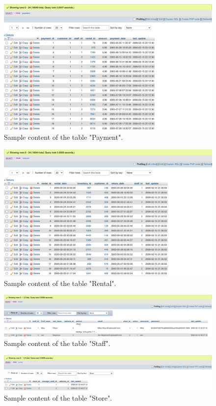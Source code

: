 \documentclass{article}
\begin{document}
		\begin{figure}[H]
			\includegraphics[width=\textwidth]{payment_content}
			\caption{Sample content of the table "Payment".}
		\end{figure}
		\begin{figure}[H]
			\includegraphics[width=\textwidth]{rental_content}
			\caption{Sample content of the table "Rental".}
		\end{figure}
		\begin{figure}[H]
			\includegraphics[width=\textwidth]{staff_content}
			\caption{Sample content of the table "Staff".}
		\end{figure}
		\begin{figure}[H]
			\includegraphics[width=\textwidth]{store_content}
			\caption{Sample content of the table "Store".}
		\end{figure}
\end{document}
